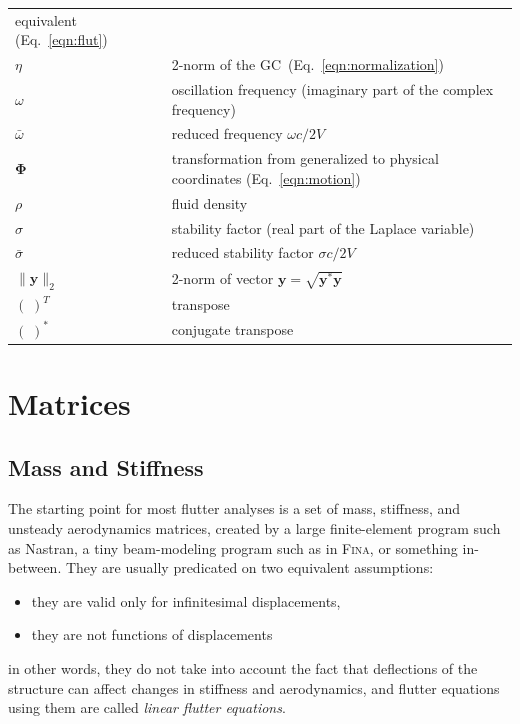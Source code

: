\documentclass[10pt,openany,twoside]{book}
\numberwithin{equation}{section}   %
\newcommand{\Fina}{{\normalfont\scshape Fina\:}}
\newcommand{\Matrix}[1]{\boldsymbol{#1}}
\newcommand{\Vector}[1]{\boldsymbol{#1}}
\newcommand{\Gc}{GC}
\newcommand{\Eqn}[1]{Eq.\ \ref{#1}}
\begin{document}
\begin{small}
\begin{longtable}{@{}lcl@{}}
	equivalent (\Eqn{eqn:flut}) \\
$\eta$ & & 2-norm of the \Gc\ (\Eqn{eqn:normalization}) \\
$\omega$ & & oscillation frequency (imaginary part of the complex frequency) \\
$\bar{\omega}$ & & reduced frequency $\omega c/2V$ \\
$\Matrix{\Phi}$ & & transformation from generalized to physical coordinates (\Eqn{eqn:motion}) \\
$\rho$ & & fluid density \\
$\sigma$ & & stability factor (real part of the Laplace variable) \\
$\bar{\sigma}$ & & reduced stability factor $\sigma c/2V$ \\
$\|\Vector{y}\|_2$ & & 2-norm of vector $\Vector{y} =
   \sqrt{\Vector{y}^*\Vector{y}}$ \index{2-norm!complex}\\
$(\;)^T$ & & transpose \\
$(\;)^*$ & & conjugate transpose \\
\end{longtable}
\end{small}

\section{Matrices}
\subsection{Mass and Stiffness}
The starting point for most flutter analyses is a set of mass,
stiffness, and unsteady aerodynamics matrices, created by
a large finite-element program such as Nastran, a tiny beam-modeling
program such as in \Fina, or something in-between.
They are usually predicated on two equivalent assumptions:
\begin{itemize}
	\item they are valid only for infinitesimal displacements,
	\item they are not functions of displacements
\end{itemize}
in other words, they do not take into account the fact that deflections
of the structure can affect changes in stiffness and aerodynamics,
and flutter equations using them are called \emph{linear flutter equations}.
\end{document}

